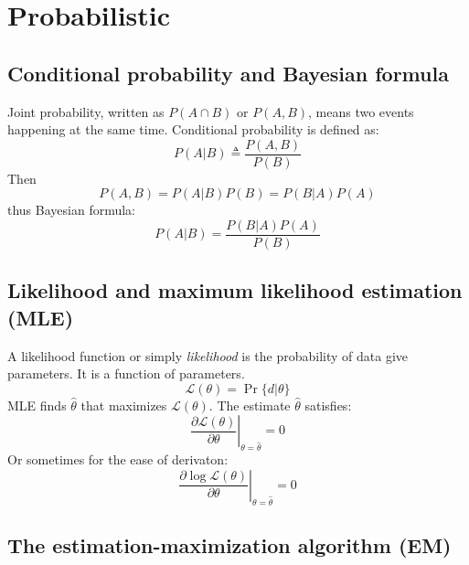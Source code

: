 \documentclass[10pt]{article}
\begin{document}
\section{Probabilistic}

\subsection{Conditional probability and Bayesian formula}

Joint probability, written as $P(A\cap B)$ or $P(A,B)$, means two events happening at the
same time.  Conditional probability is defined as:
$$
P(A|B)\triangleq\frac{P(A,B)}{P(B)}
$$
Then
$$
P(A,B)=P(A|B)P(B)=P(B|A)P(A)
$$
thus Bayesian formula:
$$
P(A|B)=\frac{P(B|A)P(A)}{P(B)}
$$

\begin{comment}
An example. Let
$$
X=\left\{\begin{array}{ll}
1 & \mbox{if sunny} \\
0 & \mbox{otherwise}
\end{array}\right.
$$
$$
Y=\left\{\begin{array}{ll}
1 & \mbox{if warm} \\
0 & \mbox{if cold}
\end{array}\right.
$$
$$
\Pr\{\mbox{sunny}\}=\Pr\{\mbox{sunny and warm}\}+\Pr\{\mbox{sunny and cold}\}
$$
$$
\Pr\{X=x\}=\sum_y\Pr\{X=x,Y=y\}
$$
\end{comment}

\subsection{Likelihood and maximum likelihood estimation (MLE)}

A likelihood function or simply \emph{likelihood} is the probability of data
give parameters. It is a function of parameters.
$$
\mathcal{L}(\theta)=\Pr\{d|\theta\}
$$
MLE finds $\hat{\theta}$ that maximizes $\mathcal{L}(\theta)$.  The estimate
$\hat{\theta}$ satisfies:
$$
\left.\frac{\partial \mathcal{L}(\theta)}{\partial\theta}\right|_{\theta=\hat{\theta}}=0
$$
Or sometimes for the ease of derivaton:
$$
\left.\frac{\partial \log\mathcal{L}(\theta)}{\partial\theta}\right|_{\theta=\hat{\theta}}=0
$$

\begin{comment}
An example. Suppose in the last August, 20 out of 31 days were sunny.
\end{comment}

\subsection{The estimation-maximization algorithm (EM)}
\end{document}
